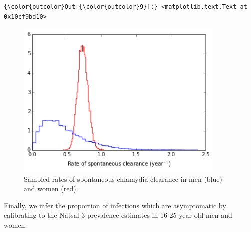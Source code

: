 \documentclass{article}
\begin{document}
    \begin{footnotesize}
            \begin{Verbatim}[commandchars=\\\{\}]
{\color{outcolor}Out[{\color{outcolor}9}]:} <matplotlib.text.Text at 0x10cf9bd10>
\end{Verbatim}
    \end{footnotesize}
        
    \begin{figure}
        \begin{center}\includegraphics[width=10cm]{england_files/england_14_1.png}\end{center}
        \caption{Sampled rates of spontaneous chlamydia clearance in men (blue) and women (red).}
        \label{fig:sc_samples}
    \end{figure}
    
    Finally, we infer the proportion of infections which are asymptomatic by
calibrating to the Natsal-3 prevalence estimates in 16-25-year-old men
and women.
\end{document}
